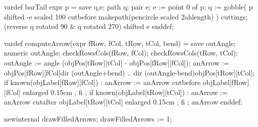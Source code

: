   vardef barTail expr p =
    save q,e; path q; pair e;
    e := point 0 of p;
    q := gobble(
      p shifted -e scaled 100
      cutbefore makepath(pencircle scaled 2ahlength)
    ) cuttings;
    (reverse q rotated 90 & q rotated 270) shifted e
  enddef;

  vardef computeArrow(expr fRow, fCol, tRow, tCol, bend) =
    save outAngle;
    numeric outAngle;
    checkRowsCols(fRow, fCol);
    checkRowsCols(tRow, tCol);
    outAngle := angle (objPos[tRow][tCol] - objPos[fRow][fCol]);
    anArrow := 
      objPos[fRow][fCol]{dir (outAngle+bend)} .. 
      {dir (outAngle-bend)}objPos[tRow][tCol];
    if known(objLabel[fRow][fCol]) :
      anArrow :=
        anArrow cutbefore
        objLabel[fRow][fCol] enlarged 0.15cm ;
    fi ;
    if known(objLabel[tRow][tCol]) :
      anArrow :=
        anArrow cutafter
        objLabel[tRow][tCol] enlarged 0.15cm ;
    fi ;
    anArrow
  enddef;

  newinternal drawFilledArrows;
  drawFilledArrows := 1;
  

